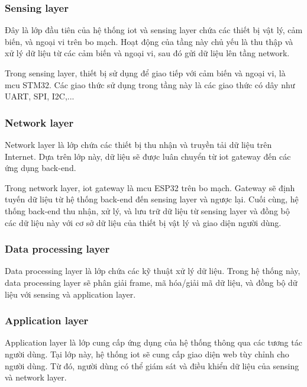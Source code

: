 \subsubsection{Sensing layer}

Đây là lớp đầu tiên của hệ thống \acrshort{iot} và sensing layer chứa các thiết bị vật lý, cảm biến, và ngoại vi trên bo mạch. Hoạt động của tầng này chủ yếu là thu thập và xử lý dữ liệu từ các cảm biến và ngoại vi, sau đó gửi dữ liệu lên tầng network.

Trong sensing layer, thiết bị sử dụng để giao tiếp với cảm biến và ngoại vi, là \acrshort{mcu} STM32. Các giao thức sử dụng trong tầng này là các giao thức có dây như UART, SPI, I2C,...

\subsubsection{Network layer}

Network layer là lớp chứa các thiết bị thu nhận và truyền tải dữ liệu trên Internet. Dựa trên lớp này, dữ liệu sẽ được luân chuyển từ \acrshort{iot} gateway đến các ứng dụng back-end.

Trong network layer, \acrshort{iot} gateway là \acrshort{mcu} ESP32 trên bo mạch. Gateway sẽ định tuyến dữ liệu từ hệ thống back-end đến sensing layer và ngược lại. Cuối cùng, hệ thống back-end thu nhận, xử lý, và lưu trữ dữ liệu từ sensing layer và đồng bộ các dữ liệu này với cơ sở dữ liệu của thiết bị vật lý và giao diện người dùng.

\subsubsection{Data processing layer}

Data processing layer là lớp chứa các kỹ thuật xử lý dữ liệu. Trong hệ thống này, data processing layer sẽ phân giải frame, mã hóa/giải mã dữ liệu, và đồng bộ dữ liệu với sensing và application layer.

\subsubsection{Application layer}

Application layer là lớp cung cấp ứng dụng của hệ thống thông qua các tương tác người dùng. Tại lớp này, hệ thống \acrshort{iot} sẽ cung cấp giao diện web tùy chỉnh cho người dùng. Từ đó, người dùng có thể giám sát và điều khiển dữ liệu của sensing và network layer.

